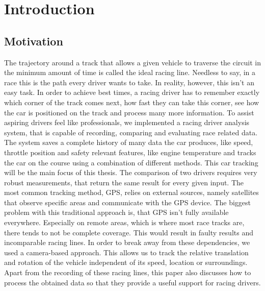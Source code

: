 \section{Introduction}
\label{sec:intro}

\subsection{Motivation}
The trajectory around a track that allows a given vehicle to traverse the circuit in the minimum amount of time is called the ideal racing line. Needless to say, in a race this is the path every driver wants to take. In reality, however, this isn't an easy task. In order to achieve best times, a racing driver has to remember exactly which corner of the track comes next, how fast they can take this corner, see how the car is positioned on the track and process many more information.
To assist aspiring drivers feel like professionals, we implemented a racing driver analysis system, that is capable of recording, comparing and evaluating race related data. The system saves a complete history of many data the car produces, like speed, throttle position and safety relevant features, like engine temperature and tracks the car on the course using a combination of different methods.
This car tracking will be the main focus of this thesis. The comparison of two drivers requires very robust measurements, that return the same result for every given input.
The most common tracking method, GPS, relies on external sources, namely satellites that observe specific areas and communicate with the GPS device. The biggest problem with this traditional approach is, that GPS isn't fully available everywhere. Especially on remote areas, which is where most race tracks are, there tends to not be complete coverage. This would result in faulty results and incomparable racing lines.
In order to break away from these dependencies, we used a camera-based approach. This allows us to track the relative translation and rotation of the vehicle independent of its speed, location or surroundings.
Apart from the recording of these racing lines, this paper also discusses how to process the obtained data so that they provide a useful support for racing drivers.

